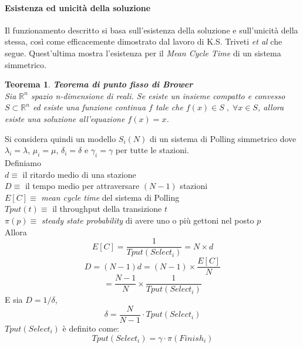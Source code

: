 \documentclass[12pt,a4paper,italian]{article}
\begin{document}
\paragraph{Esistenza ed unicità della soluzione} Il funzionamento descritto si basa sull'esistenza della soluzione e sull'unicità della stessa, così come efficacemente dimostrato dal lavoro di K.S. Triveti \emph{et al}\cite{fixedpoint} che segue.
Quest'ultima mostra l'esistenza per il \emph{Mean Cycle Time} di un sistema simmetrico.\\
\newtheorem{brower}{Teorema}
\begin{brower}{\textbf{Teorema di punto fisso di Brower\\}}
	Sia $ \mathbb{R}^n $ spazio n-dimensione di reali. Se esiste un insieme compatto e convesso $S \subset \mathbb{R}^n$ ed esiste una funzione continua $f$ tale che $f(x) \in S\;,\;  \forall x \in S$, allora esiste una soluzione all'equazione $f(x) = x$.   
\end{brower}
Si considera quindi un modello $S_i(N)$ di un sistema di Polling simmetrico dove $\lambda_i = \lambda$, $\mu_i = \mu$, $\delta_i = \delta$ e $\gamma_i = \gamma$ per tutte le stazioni.\\
\newline
Definiamo\\
$d\equiv$  il ritardo medio di una stazione\\
$D\equiv$ il tempo medio per attraversare $(N-1)$ stazioni\\
$E[C]\equiv$ \emph{mean cycle time} del sistema di Polling\\
$Tput(t)\equiv$ il throughput della transizione $t$\\
$\pi(p)\equiv$ \emph{steady state probability} di avere uno o più gettoni nel posto $p$\\
Allora\\
\begin{equation*}
E[C] = \frac{1}{Tput(Select_i)} = N \times d
\end{equation*}
\begin{equation*}
D = (N- 1)d = (N - 1)\times\frac{E[C]}{N}
\end{equation*}
\begin{equation*}
= \frac{N -1}{N} \times \frac{1}{Tput(Select_i)}
\end{equation*}
E sia $D = 1/\delta$,
\begin{equation*}
\delta = \frac{N}{N -1} \cdot Tput(Select_i)
\end{equation*}
$Tput(Select_i)$ è definito come:
\begin{equation*}
Tput(Select_i) = \gamma \cdot \pi(Finish_i)
\end{equation*}
\end{document}
